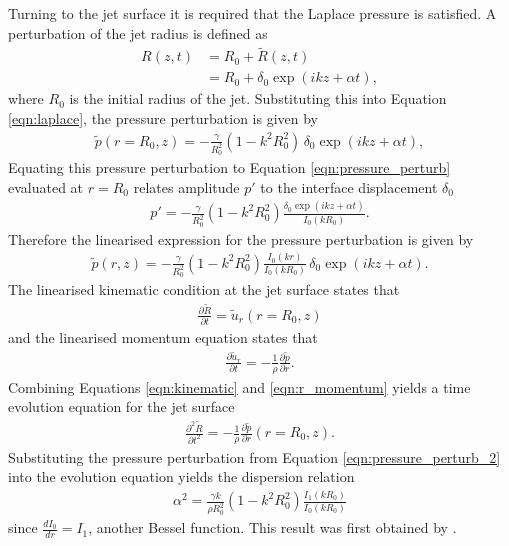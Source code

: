 \documentclass[11pt]{article}
\newcommand{\od}[2]{\frac{d #1}{d #2}}
\newcommand{\pd}[2]{\frac{\partial #1}{\partial #2}}
\newcommand{\pdtwo}[2]{\frac{\partial ^2 #1}{\partial #2 ^2}}
\begin{document}
Turning to the jet surface it is required that the Laplace pressure is 
satisfied. A perturbation of the jet radius is defined as
\begin{align*}
R(z,t) &=  R_0 + \tilde{R} (z,t) \nonumber \\
& = R_0 + \delta_0 \exp(ikz + \alpha t),
\end{align*}
where $R_0$ is the initial radius of the jet. Substituting this into Equation 
\ref{eqn:laplace}, the pressure perturbation is given by
\begin{align*}
\tilde{p}(r=R_0,z) = -\frac{\gamma}{R_0^2} (1 - k^2 R_0^2) \, \delta_0 \exp(ikz 
+ \alpha t),
\end{align*}
Equating this pressure perturbation to Equation \ref{eqn:pressure_perturb} 
evaluated at $r=R_0$ relates amplitude $p'$ to the interface displacement 
$\delta_0$
\begin{align*}
p' = -\frac{\gamma}{R_0^2}(1-k^2 R_0^2) \frac{\delta_0 \exp (ikz + \alpha 
t)}{I_0(kR_0)}.
\end{align*}
Therefore the linearised expression for the pressure perturbation is given by
\begin{align}
\tilde{p}(r,z) = -\frac{\gamma}{R_0^2} (1 - k^2 R_0^2) \frac{I_0(kr)}{I_0 
(kR_0)} \, \delta_0 \exp(ikz + \alpha t).
\label{eqn:pressure_perturb_2}
\end{align}
The linearised kinematic condition at the jet surface states that
\begin{align}
\pd{\tilde{R}}{t} = \tilde{u}_r(r =R_0,z)
\label{eqn:kinematic}
\end{align}
and the linearised momentum equation states that
\begin{align}
\pd{\tilde{u}_r}{t} = - \frac{1}{\rho} \pd{\tilde{p}}{r}.
\label{eqn:r_momentum}
\end{align}
Combining Equations \ref{eqn:kinematic} and \ref{eqn:r_momentum} yields a time 
evolution equation for the jet surface
\begin{align}
\pdtwo{\tilde{R}}{t} = - \frac{1}{\rho} \pd{\tilde{p}}{r}(r = R_0, z).
\end{align}
Substituting the pressure perturbation from Equation \ref{eqn:pressure_perturb_2} 
into the evolution equation yields the dispersion relation
\begin{align}
\alpha^2 = \frac{\gamma k}{\rho R_0^2} (1 - k^2 R_0^2) \frac{I_1(kR_0)}{I_0(kR_0)}
\label{eqn:dispersion_rayleigh}
\end{align}
since $\od{I_0}{r} = I_1$, another Bessel function. This result was first 
obtained by \cite{strutt1878instability}.
\end{document}

